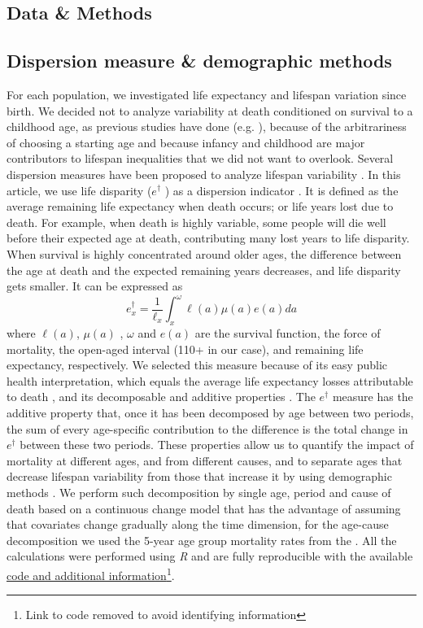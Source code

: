 \documentclass{article}
\begin{document}
\begin{spacing}{1.5}
\section*{Data \& Methods}

\subsection*{Dispersion measure \& demographic methods}

For each population, we investigated life expectancy and lifespan variation since birth. We decided not to analyze variability at death conditioned on survival to a childhood age, as previous studies have done (e.g. \citet{edwards2005, smits2009}), because of the arbitrariness of choosing a starting age and because infancy and childhood are major contributors to lifespan inequalities that we did not want to overlook. 
Several dispersion measures have been proposed to analyze lifespan variability \citep{vanraalte2013, wilmoth1999}. In this article, we use life disparity ($e^{\dagger}$ ) as a dispersion indicator \citep{vaupel&Canudas2003}. It is defined as the average remaining life expectancy when death occurs; or life years lost due to death.  For example, when death is highly variable, some people will die well before their expected age at death, contributing many lost years to life disparity. When survival is highly concentrated around older ages, the difference between the age at death and the expected remaining years decreases, and life disparity gets smaller.  It can be expressed as
\begin{equation}
\label{eq.edagger}
e_x^{\dagger}=\frac{1}{\ell_x}\int_x^\omega \ell(a) \mu(a)e(a)da
\end{equation}
where $\ell(a)$, $\mu(a)$ , $\omega$ and $e(a)$ are the survival function, the force of mortality, the open-aged interval (110+ in our case), and remaining life expectancy, respectively. 
We selected this measure because of its easy public health interpretation, which equals the average life expectancy losses attributable to death \citep{shkolnikov2011}, and its decomposable and additive properties \citep{zhang2009}. The $e^\dagger$ measure has the additive property that, once it has been decomposed by age between two periods, the sum of every age-specific contribution to the difference is the total change in $e^\dagger$ between these two periods. These properties allow us to quantify the impact of mortality at different ages, and from different causes, and to separate ages that decrease lifespan variability from those that increase it by using demographic methods \citep{zhang2009, shkolnikov2011}. We perform such decomposition by single age, period and cause of death based on a continuous change model \citep{horiuchi2008} that has the advantage of assuming that covariates change gradually along the time dimension, for the age-cause decomposition we used the 5-year age group mortality rates from the \cite{HcO}. All the calculations were performed using \textit{R} \citep{team2000r} and are fully reproducible with the available \href{}{code and additional information}\footnote{Link to code removed to avoid identifying information}.\\


\end{spacing}
\end{document}
